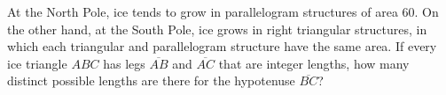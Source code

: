 At the North Pole, ice tends to grow in parallelogram structures of area $60$. On the other hand, at the South Pole, ice grows in right triangular structures, in which each triangular and parallelogram structure have the same area. If every ice triangle $ABC$ has legs $\overline{AB}$ and $\overline{AC}$ that are integer lengths, how many distinct possible lengths are there for the hypotenuse $\overline{BC}$?
